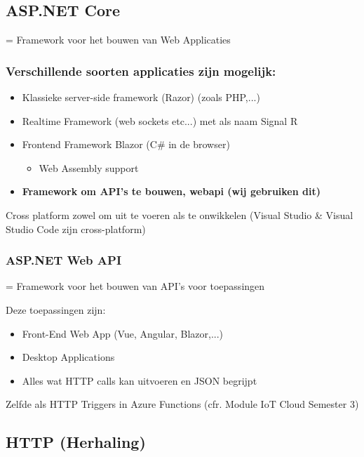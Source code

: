\documentclass{article}
\begin{document}
\subsection{ASP.NET Core}

= Framework voor het bouwen van Web Applicaties

\subsubsection{Verschillende soorten applicaties zijn mogelijk:}

\begin{itemize}
    \item Klassieke server-side framework (Razor) (zoals PHP,...)
    \item Realtime Framework (web sockets etc...) met als naam Signal R
    \item Frontend Framework Blazor (C\# in de browser)
    \begin{itemize}
        \item Web Assembly support
    \end{itemize}
    \item \textbf{Framework om API’s te bouwen, webapi (wij gebruiken dit)}
\end{itemize}

Cross platform zowel om uit te voeren als te onwikkelen (Visual Studio \& Visual Studio Code zijn cross-platform)

\subsubsection{ASP.NET Web API}

= Framework voor het bouwen van API’s voor toepassingen

Deze toepassingen zijn:

\begin{itemize}
    \item Front-End Web App (Vue, Angular, Blazor,...)
    \item Desktop Applications
    \item Alles wat HTTP calls kan uitvoeren en JSON begrijpt
\end{itemize}

Zelfde als HTTP Triggers in Azure Functions (cfr. Module IoT Cloud Semester 3)

\subsection{HTTP (Herhaling)}
\end{document}
